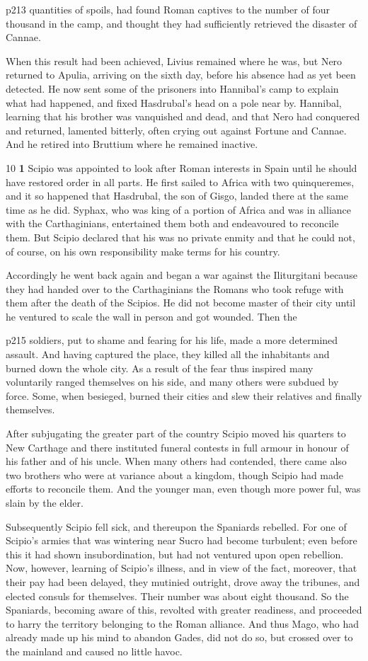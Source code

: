 p213 quantities of spoils, had found Roman captives to the number of four thousand in the camp, and thought they had sufficiently retrieved the disaster of Cannae.

When this result had been achieved, Livius remained where he was, but Nero returned to Apulia, arriving on the sixth day, before his absence had as yet been detected. He now sent some of the prisoners into Hannibal's camp to explain what had happened, and fixed Hasdrubal's head on a pole near by. Hannibal, learning that his brother was vanquished and dead, and that Nero had conquered and returned, lamented bitterly, often crying out against Fortune and Cannae. And he retired into Bruttium where he remained inactive.

10
\textbf{1} Scipio was appointed to look after Roman interests in Spain until he should have restored order in all parts. He first sailed to Africa with two quinqueremes, and it so happened that Hasdrubal, the son of Gisgo, landed there at the same time as he did. Syphax, who was king of a portion of Africa and was in alliance with the Carthaginians, entertained them both and endeavoured to reconcile them. But Scipio declared that his was no private enmity and that he could not, of course, on his own responsibility make terms for his country.

Accordingly he went back again and began a war against the Iliturgitani because they had handed over to the Carthaginians the Romans who took refuge with them after the death of the Scipios. He did not become master of their city until he ventured to scale the wall in person and got wounded. Then the

p215 soldiers, put to shame and fearing for his life, made a more determined assault. And having captured the place, they killed all the inhabitants and burned down the whole city. As a result of the fear thus inspired many voluntarily ranged themselves on his side, and many others were subdued by force. Some, when besieged, burned their cities and slew their relatives and finally themselves.

After subjugating the greater part of the country Scipio moved his quarters to New Carthage and there instituted funeral contests in full armour in honour of his father and of his uncle. When many others had contended, there came also two brothers who were at variance about a kingdom, though Scipio had made efforts to reconcile them. And the younger man, even though more power ­ful, was slain by the elder.

Subsequently Scipio fell sick, and thereupon the Spaniards rebelled. For one of Scipio's armies that was wintering near Sucro had become turbulent; even before this it had shown insubordination, but had not ventured upon open rebellion. Now, however, learning of Scipio's illness, and in view of the fact, moreover, that their pay had been delayed, they mutinied outright, drove away the tribunes, and elected consuls for themselves. Their number was about eight thousand. So the Spaniards, becoming aware of this, revolted with greater readiness, and proceeded to harry the territory belonging to the Roman alliance. And thus Mago, who had already made up his mind to abandon Gades, did not do so, but crossed over to the mainland and caused no little havoc.

